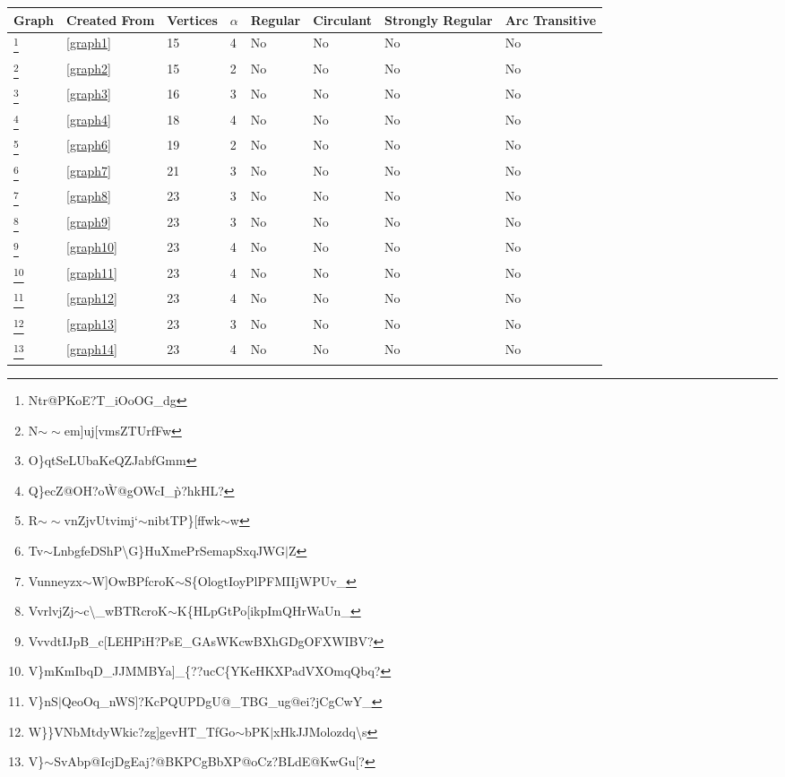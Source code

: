 \documentclass[12pt]{article}
\theoremstyle{parenbold}
\begin{document}
\renewcommand{\thempfootnote}{\arabic{mpfootnote}}
\begin{center}
\begin{minipage}{\textwidth}
\begin{tabular}{ |p{1cm}|p{1.2cm}|p{1.5cm}|p{0.5cm}|p{1.5cm}|p{2.7cm}|p{2cm}|p{1cm}| } 
 \hline
 Graph & Created From & Vertices & $\alpha$ & Regular & Circulant & Strongly Regular & Arc Transitive\\ 
 \hline
 \footnote{Ntr@PKoE?T\_iOoOG\_dg\label{del1graph1}} & \ref{graph1} & 15 & 4 & No & No & No & No\\
 \hline
 \footnote{N$\sim\sim$em]uj[vmsZTUrfFw\label{del1graph2}} & \ref{graph2} & 15 & 2 & No & No & No & No\\
 \hline
 \footnote{O\}qtSeLUbaKeQZJabfGmm\label{del1graph3}} & \ref{graph3} & 16 & 3 & No & No & No & No\\
 \hline
 \footnote{Q\}ecZ@OH?o\`W@gOWcI\_\`p?hkHL?\label{del1graph4}} & \ref{graph4} & 18 & 4 & No & No & No & No\\
 \hline
 \footnote{R$\sim\sim$vnZjvUtvimj`$\sim$nibtTP\}[ffwk$\sim$w\label{del1graph5}} & \ref{graph6} & 19 & 2 & No & No & No & No\\
 \hline
 \footnote{Tv$\sim$LnbgfeDShP\textbackslash{}G\}HuXmePrSemapSxqJWG$\vert$Z\label{del1graph6}} & \ref{graph7} & 21 & 3 & No & No & No & No\\
 \hline
 \footnote{Vunneyzx$\sim$W]OwBPfcroK$\sim$S\{OlogtIoyPlPFMIIjWPUv\_\label{del1graph7}} & \ref{graph8} & 23 & 3 & No & No & No & No\\
 \hline
  \footnote{VvrlvjZj$\sim$c\textbackslash{}\_wBTRcroK$\sim$K\{HLpGtPo[ikpImQHrWaUn\_\label{del1graph8}} & \ref{graph9} & 23 & 3 & No & No & No & No\\
 \hline
  \footnote{VvvdtIJpB\_c[LEHPiH?PsE\_GAsWKcwBXhGDgOFXWIBV?\label{del1graph9}} & \ref{graph10} & 23 & 4 & No & No & No & No\\
 \hline
  \footnote{V\}mKmIbqD\_JJMMBYa]\_\{??ucC\{YKeHKXPadVXOmqQbq?\label{del1graph10}} & \ref{graph11} & 23 &  4 & No & No & No & No\\
 \hline
  \footnote{V\}nS$\vert$QeoOq\_nWS]?KcPQUPDgU@\_TBG\_ug@ei?jCgCwY\_\label{del1graph11}} & \ref{graph12} & 23 & 4 & No & No & No & No\\
 \hline
  \footnote{W\}\}VNbMtdyWkic?zg]gevHT\_TfGo$\sim$bPK$\vert$xHkJJMolozdq\textbackslash{}s\label{del1graph12}} & \ref{graph13} & 23 & 3 & No & No & No & No\\
 \hline
  \footnote{V\}$\sim$SvAbp@IcjDgEaj?@BKPCgBbXP@oCz?BLdE@KwGu[?\label{del1graph13}} & \ref{graph14} & 23 & 4 & No & No & No & No\\

\end{tabular}
\end{minipage}
\end{center}
\end{document}
